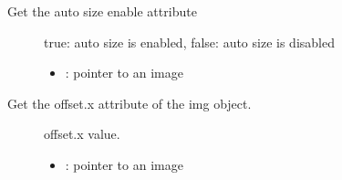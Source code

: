 \documentclass[letterpaper,10pt,english]{sphinxmanual}
\begin{document}

\begin{fulllineitems}
\label{\detokenize{object-types/img:_CPPv420lv_img_get_auto_sizePK8lv_obj_t}}%
\pysigstartmultiline
{}\label{\detokenize{object-types/img:lv__img_8h_1abbf5747670b2ef6b295c1f064c4a54bd}}%
\pysigstopmultiline
Get the auto size enable attribute \begin{description}
\item[{}] \leavevmode
true: auto size is enabled, false: auto size is disabled 

\item[{}] \leavevmode\begin{itemize}
\item {} 
: pointer to an image 

\end{itemize}

\end{description}


\end{fulllineitems}


\begin{fulllineitems}
\label{\detokenize{object-types/img:_CPPv419lv_img_get_offset_xP8lv_obj_t}}%
\pysigstartmultiline
{}\label{\detokenize{object-types/img:lv__img_8h_1abfae4d38794db84502ebfbeba61117bf}}%
\pysigstopmultiline
Get the offset.x attribute of the img object. \begin{description}
\item[{}] \leavevmode
offset.x value. 

\item[{}] \leavevmode\begin{itemize}
\item {} 
: pointer to an image 

\end{itemize}

\end{description}


\end{fulllineitems}
\end{document}
